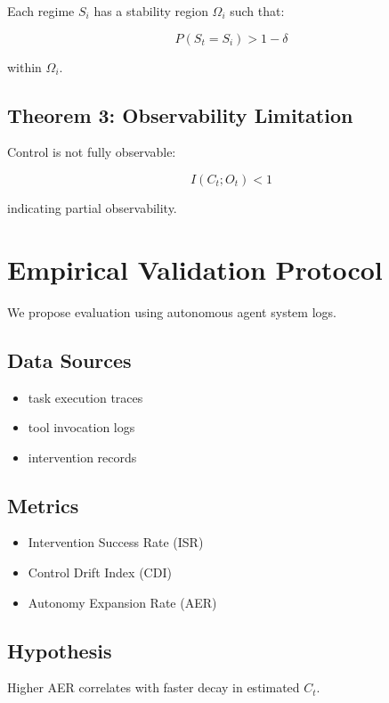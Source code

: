 \documentclass[11pt]{article}
\begin{document}
Each regime $S_i$ has a stability region $\Omega_i$ such that:

\begin{equation}
P(S_t = S_i) > 1 - \delta
\end{equation}

within $\Omega_i$.

\subsection{Theorem 3: Observability Limitation}

Control is not fully observable:

\begin{equation}
I(C_t; O_t) < 1
\end{equation}

indicating partial observability.

\section{Empirical Validation Protocol}

We propose evaluation using autonomous agent system logs.

\subsection{Data Sources}
\begin{itemize}
\item task execution traces
\item tool invocation logs
\item intervention records
\end{itemize}

\subsection{Metrics}
\begin{itemize}
\item Intervention Success Rate (ISR)
\item Control Drift Index (CDI)
\item Autonomy Expansion Rate (AER)
\end{itemize}

\subsection{Hypothesis}
Higher AER correlates with faster decay in estimated $C_t$.
\end{document}
